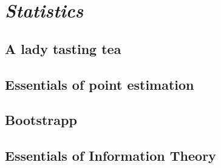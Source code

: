 \chapter{\emph{Statistics}} 
\label{statistics}
 

\section{A lady tasting tea}
\section{Essentials of point estimation}
\section{Bootstrapp}
\section{Essentials of Information Theory}